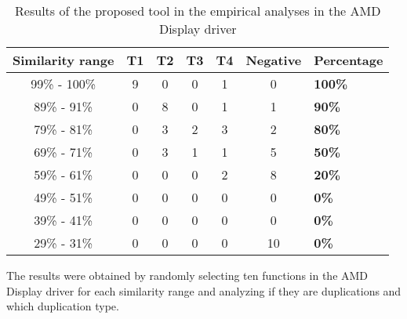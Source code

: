 \begin{table}
\begin{tabular}{ | c | c | c | c | c | c | m{8em} | }

\hline

\textbf{Similarity range} & \textbf{T1} & \textbf{T2} & \textbf{T3} & \textbf{T4}
& \textbf{Negative} & \textbf{Percentage} \\ \hline 
99\% - 100\% & 9 & 0 & 0 & 1 & 0 & \textbf{100\%} \\ \hline
89\% - 91\% & 0 & 8 & 0 & 1 & 1 & \textbf{90\%} \\ \hline
79\% - 81\% & 0 & 3 & 2 & 3 & 2 & \textbf{80\%} \\ \hline
69\% - 71\% & 0 & 3 & 1 & 1 & 5 & \textbf{50\%} \\ \hline
59\% - 61\% & 0 & 0 & 0 & 2 & 8 & \textbf{20\%} \\ \hline
49\% - 51\% & 0 & 0 & 0 & 0 & 0 & \textbf{0\%} \\ \hline
39\% - 41\% & 0 & 0 & 0 & 0 & 0 & \textbf{0\%} \\ \hline
29\% - 31\% & 0 & 0 & 0 & 0 & 10 & \textbf{0\%} \\ \hline

\hline

\end{tabular}
\label{tab:emp}
\caption{Results of the proposed tool in the empirical analyses in the AMD Display driver}

The results were obtained by randomly selecting ten functions in the AMD Display driver for 
each similarity range and analyzing if they are duplications and which duplication type.

\end{table}

